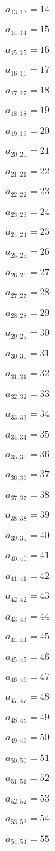 \documentclass[a4paper,12pt]{article}
\begin{document}
$a _{ 13, 13 } = 14$

$a _{ 14, 14 } = 15$

$a _{ 15, 15 } = 16$

$a _{ 16, 16 } = 17$

$a _{ 17, 17 } = 18$

$a _{ 18, 18 } = 19$

$a _{ 19, 19 } = 20$

$a _{ 20, 20 } = 21$

$a _{ 21, 21 } = 22$

$a _{ 22, 22 } = 23$

$a _{ 23, 23 } = 24$

$a _{ 24, 24 } = 25$

$a _{ 25, 25 } = 26$

$a _{ 26, 26 } = 27$

$a _{ 27, 27 } = 28$

$a _{ 28, 28 } = 29$

$a _{ 29, 29 } = 30$

$a _{ 30, 30 } = 31$

$a _{ 31, 31 } = 32$

$a _{ 32, 32 } = 33$

$a _{ 33, 33 } = 34$

$a _{ 34, 34 } = 35$

$a _{ 35, 35 } = 36$

$a _{ 36, 36 } = 37$

$a _{ 37, 37 } = 38$

$a _{ 38, 38 } = 39$

$a _{ 39, 39 } = 40$

$a _{ 40, 40 } = 41$

$a _{ 41, 41 } = 42$

$a _{ 42, 42 } = 43$

$a _{ 43, 43 } = 44$

$a _{ 44, 44 } = 45$

$a _{ 45, 45 } = 46$

$a _{ 46, 46 } = 47$

$a _{ 47, 47 } = 48$

$a _{ 48, 48 } = 49$

$a _{ 49, 49 } = 50$

$a _{ 50, 50 } = 51$

$a _{ 51, 51 } = 52$

$a _{ 52, 52 } = 53$

$a _{ 53, 53 } = 54$

$a _{ 54, 54 } = 55$
\end{document}
